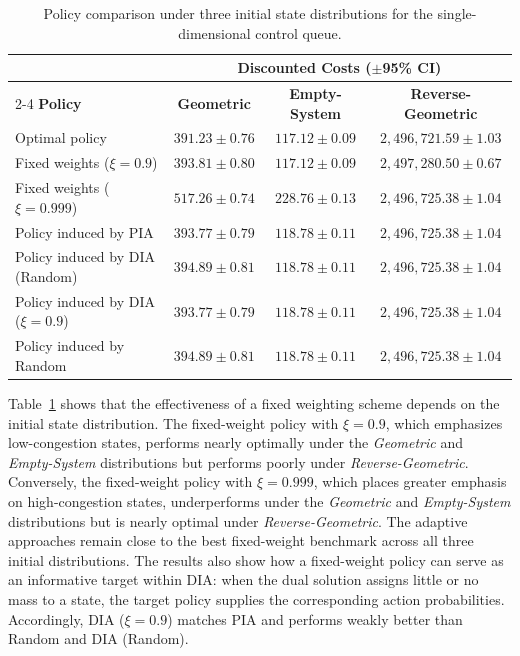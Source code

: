 \documentclass[sglanonrev]{informs4}
\begin{document}
\begin{table}[ht]
\centering
\footnotesize
\caption{Policy comparison under three initial state distributions for the single-dimensional control queue.}
\begin{tabular}{lccc}
  \toprule
  & \multicolumn{3}{c}{\textbf{Discounted Costs ($\pm$95\% \ac{CI})}} \\
  \cmidrule(lr){2-4}
  \textbf{Policy} & \textbf{Geometric} & \textbf{Empty-System} & \textbf{Reverse-Geometric} \\
  \midrule
  Optimal policy                     & $391.23 \pm 0.76$  & $117.12 \pm 0.09$  & $2,496,721.59 \pm 1.03$ \\
  Fixed weights ($\xi=0.9$)          & $393.81 \pm 0.80$  & $117.12 \pm 0.09$  & $2,497,280.50 \pm 0.67$ \\
  Fixed weights ($\xi=0.999$)        & $517.26 \pm 0.74$  & $228.76 \pm 0.13$  & $2,496,725.38 \pm 1.04$ \\
  Policy induced by \ac{PIA}              & $393.77 \pm 0.79$  & $118.78 \pm 0.11$  & $2,496,725.38 \pm 1.04$ \\
  Policy induced by \ac{DIA} (Random)     & $394.89 \pm 0.81$  & $118.78 \pm 0.11$  & $2,496,725.38 \pm 1.04$ \\
  Policy induced by \ac{DIA} ($\xi=0.9$)  & $393.77 \pm 0.79$  & $118.78 \pm 0.11$  & $2,496,725.38 \pm 1.04$ \\
  Policy induced by Random  & $394.89 \pm 0.81$  & $118.78 \pm 0.11$  & $2,496,725.38 \pm 1.04$ \\
  \bottomrule
\end{tabular}
\label{tab:policy_comparison_single_queue}
\end{table}


Table~\ref{tab:policy_comparison_single_queue} shows that the effectiveness of a fixed weighting scheme depends on the initial state distribution. The fixed-weight policy with $\xi=0.9$, which emphasizes low-congestion states, performs nearly optimally under the \textit{Geometric} and \textit{Empty-System} distributions but performs poorly under \textit{Reverse-Geometric}. Conversely, the fixed-weight policy with $\xi=0.999$, which places greater emphasis on high-congestion states, underperforms under the \textit{Geometric} and \textit{Empty-System} distributions but is nearly optimal under \textit{Reverse-Geometric}. The adaptive approaches remain close to the best fixed-weight benchmark across all three initial distributions. The results also show how a fixed-weight policy can serve as an informative target within \ac{DIA}: when the dual solution assigns little or no mass to a state, the target policy supplies the corresponding action probabilities. Accordingly, \ac{DIA} ($\xi=0.9$) matches \ac{PIA} and performs weakly better than Random and \ac{DIA} (Random).
\end{document}
